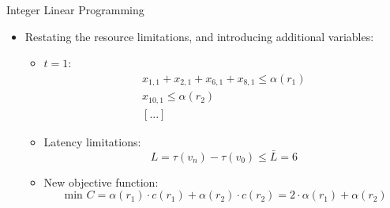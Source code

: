\begin{frame}[allowframebreaks]{Integer Linear Programming}
  \begin{solutionnoinc}
    \begin{itemize}
      \item \alert{Restating the resource limitations, and introducing additional variables:}
        \begin{itemize}
          \item $t=1$:
            \[
            \begin{gathered}
            x_{1,1}+x_{2,1}+x_{6,1}+x_{8,1} \leq \alpha\left(r_1\right) \\
            x_{10,1} \leq \alpha\left(r_2\right) \\
            [...]
            \end{gathered}
            \]
          \item \alert{Latency limitations:}
            \[
            L=\tau\left(v_n\right)-\tau\left(v_0\right) \leq \bar{L}=6
            \]
          \item \alert{New objective function:}
            \[
            \text { min } C=\alpha\left(r_1\right) \cdot c\left(r_1\right)+\alpha\left(r_2\right) \cdot c\left(r_2\right)=2 \cdot \alpha\left(r_1\right)+\alpha\left(r_2\right)
            \]
        \end{itemize}
    \end{itemize}
  \end{solutionnoinc}
\end{frame}
